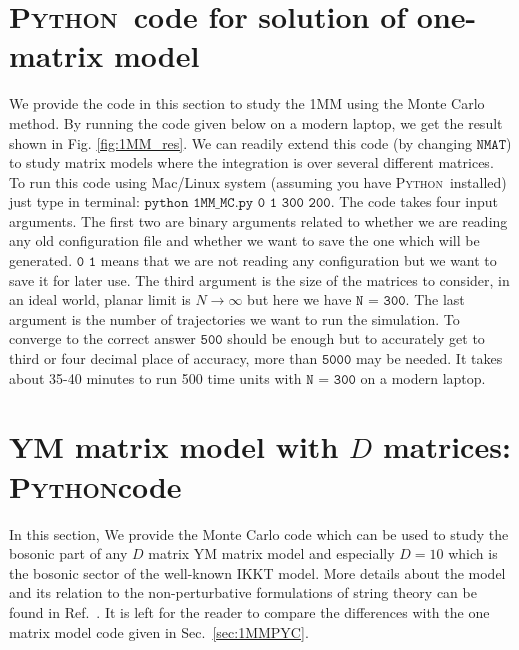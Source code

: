 \documentclass[11pt]{article}
\newcommand{\PY}{\textsc{Python}}
\begin{document}
\section{\label{sec:1MMPYC}\PY~code for solution of one-matrix model}
We provide the code in this section to study the 1MM using the Monte Carlo method. By running the code given below
on a modern laptop, we get the result shown in 
Fig. \ref{fig:1MM_res}. We can readily extend this code (by changing $\texttt{NMAT}$) to study matrix models where the integration is over several different matrices. 
To run this code using Mac/Linux system (assuming you have \PY~installed) just type in terminal: 
$\texttt{python 1MM\_MC.py 0 1 300 200}$. The code takes four input arguments. The first two are binary arguments
related to whether we are reading any old configuration file and whether we want to save the one which will be 
generated. $\texttt{0 1}$ means that we are not reading any configuration but we want to save it for later use. 
The third argument is the size of the matrices to consider, in an ideal world, planar limit is $ N \to \infty$ but here
we have $\texttt{N = 300}$. The last argument is the 
number of trajectories we want to run the simulation. 
To converge to the correct answer $\texttt{500}$ should be enough but to accurately 
get to third or four decimal place of accuracy, 
more than $\texttt{5000}$ may be needed. 
It takes about 35-40 minutes to run 500 time units 
with $\texttt{N = 300}$ on a modern laptop. 


\begin{footnotesize} 
\begin{mdframed}[backgroundcolor=mauve!3] 

\end{mdframed} 
\end{footnotesize} 

\vspace{10mm}
 
\section{\label{sec:YMC}YM matrix model with $D$ matrices: \PY code}

In this section, We provide the Monte Carlo code which can be used to study the bosonic part of any $D$ matrix YM matrix model and especially $D=10$ which is the bosonic sector of the well-known IKKT model. More details about the model and its relation to the non-perturbative formulations of string theory can be found in Ref.~\cite{Hotta:1998en}.
It is left for the reader to compare the differences with the one matrix model code given in Sec.~\ref{sec:1MMPYC}. 
\end{document}
